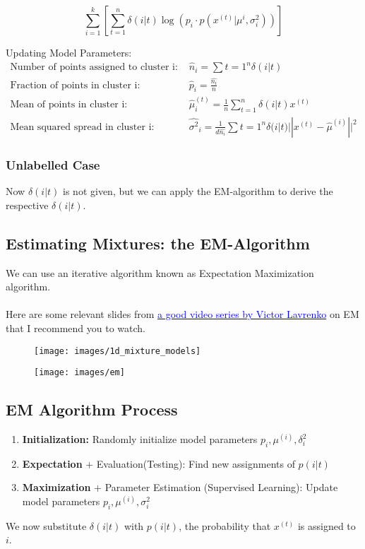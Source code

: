 \documentclass[a4paper]{article}
\begin{document}
$$ \sum_{i=1}^k\left[\sum_{t=1}^n \delta(i|t)\log(p_i\cdot p(x^{(t)}|\mu^{i}, \sigma^2_i))\right] $$

\noindent Updating Model Parameters: 
\begin{align*}
	\text{Number of points assigned to cluster i: } &\hat{n}_i = \sum{t=1}^n \delta(i|t)\\
	\text{Fraction of points in cluster i: } &\hat{p}_i = \frac{\hat{n_i}}{n}\\
	\text{Mean of points in cluster i: } &\hat{\mu}^{(t)}_i = \frac{1}{n}\sum_{t=1}^n \delta(i|t)x^{(t)}\\
	\text{Mean squared spread in cluster i: } &\hat{\sigma^2}_i = \frac{1}{d\hat{n_i}}\sum{t=1}^n \delta(i|t)||x^{(t)}-\hat{\mu}^{(i)}||^2
\end{align*}

\subsubsection{Unlabelled Case}
Now $\delta(i|t)$ is not given, but we can apply the EM-algorithm to derive the respective $\delta(i|t)$.

\subsection{Estimating Mixtures: the EM-Algorithm}
We can use an iterative algorithm known as Expectation Maximization algorithm.\\
\\
\noindent Here are some relevant slides from \href{https://www.youtube.com/watch?v=REypj2sy_5U&list=PLBv09BD7ez_4e9LtmK626Evn1ion6ynrt}{\textcolor{blue}{a good video series by Victor Lavrenko}} on EM that I recommend you to watch.

\begin{figure}[H]
	\centering
	\texttt{[image: images/1d\_mixture\_models]}
	\label{fig:1d_mixture_models}
\end{figure}
\begin{figure}[H]
	\centering
	\texttt{[image: images/em]}
	\label{fig:em}
\end{figure}
\newpage
\subsection{EM Algorithm Process}
\begin{enumerate}
	\item \textbf{Initialization:} Randomly initialize model parameters $p_i,\mu^{(i)},\delta_i^2$
	\item \textbf{Expectation} + Evaluation(Testing): Find new assignments of $p(i|t)$
	\item \textbf{Maximization} + Parameter Estimation (Supervised Learning): Update model parameters $p_i,\mu^{(i)},\sigma_i^2$
\end{enumerate}
We now substitute $\delta(i|t)$ with $p(i|t)$, the probability that $x^{(t)}$ is assigned to $i$.
\end{document}
